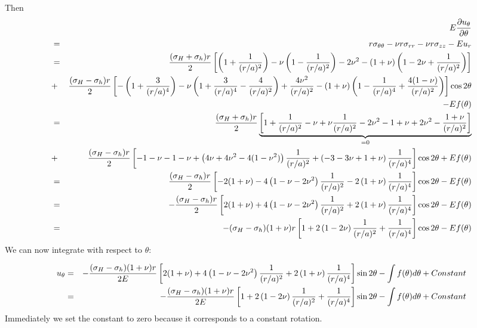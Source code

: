 Then
\begin{eqnarray}
&&E\frac{\partial u_\theta}{\partial \theta} \nonumber\\
&=& r\sigma_{\theta\theta} -\nu r\sigma_{rr} -\nu r\sigma_{zz} - E u_r  \nonumber\\
&=& \frac{(\sigma_H+\sigma_h)r}{2} 
\left[ 
\left(1+\frac{1}{(r/a)^2} \right)
-\nu\left(1-\frac{1}{(r/a)^2} \right)
-2 \nu^2
-(1+\nu) \left( 1 -2\nu +\frac{1}{(r/a)^2} \right) 
\right] \nonumber\\
&+&
\frac{(\sigma_H-\sigma_h) r}{2}
\left[
-\left( 1 + \frac{3}{(r/a)^4}   \right)
-\nu\left( 1 + \frac{3}{(r/a)^4} - \frac{4}{(r/a)^2}   \right)
+ \frac{4 \nu^2  }{(r/a)^2}
-(1+\nu)\left(  1 - \frac{1}{(r/a)^4} + \frac{4(1-\nu)}{(r/a)^2}  \right)
\right] \cos 2\theta \nonumber\\
&&  -E f(\theta)\nonumber\\
&=& 
\frac{(\sigma_H+\sigma_h)r}{2} 
\underbrace{\left[ 
1+\frac{1}{(r/a)^2} 
-\nu +\nu \frac{1}{(r/a)^2} 
-2\nu^2 - 1 +\nu  +2 \nu^2 -\frac{1+\nu}{(r/a)^2} 
\right]}_{=0} \nonumber\\
&+&
\frac{(\sigma_H-\sigma_h) r}{2}
\left[
-1 -\nu  -1 -\nu
+\left(  4\nu +4\nu^2 -4(1-\nu^2)  \right)\frac{1}{(r/a)^2}
+\left( -3 -3\nu +1+\nu  \right)\frac{1}{(r/a)^4}
\right] \cos 2\theta  + E f(\theta)\nonumber\\
&=& 
\frac{(\sigma_H-\sigma_h) r}{2}
\left[
-2(1+\nu)
-4\left( 1 - \nu -2\nu^2 \right)\frac{1}{(r/a)^2}
-2 \left( 1+\nu   \right)\frac{1}{(r/a)^4}
\right] \cos 2\theta    -E f(\theta) \nonumber\\
&=& 
-\frac{(\sigma_H-\sigma_h) r}{2}
\left[ 2(1+\nu) +4\left( 1 - \nu -2\nu^2 \right)\frac{1}{(r/a)^2}
+2 \left( 1+\nu   \right)\frac{1}{(r/a)^4}
\right] \cos 2\theta -E f(\theta) \nonumber\\
&=& 
-(\sigma_H-\sigma_h)(1+\nu) r
\left[ 
1 +2\left( 1 - 2\nu \right)\frac{1}{(r/a)^2}
+ \frac{1}{(r/a)^4}
\right] \cos 2\theta -E f(\theta) \nonumber
\end{eqnarray}
We can now integrate with respect to $\theta$:


\begin{eqnarray}
u_\theta
&=& 
-\frac{(\sigma_H-\sigma_h)(1+\nu) r}{2E}
\left[
2(1+\nu)
+4\left( 1 - \nu -2\nu^2 \right)\frac{1}{(r/a)^2}
+2 \left( 1+\nu   \right)\frac{1}{(r/a)^4}
\right]  \sin 2\theta - \int f(\theta) d\theta + Constant\nonumber\\
&=& 
-\frac{(\sigma_H-\sigma_h) (1+\nu)r}{2E}
\left[
1 +2\left( 1 - 2\nu \right)\frac{1}{(r/a)^2}
+ \frac{1}{(r/a)^4}
\right]  \sin 2\theta - \int f(\theta) d\theta + Constant \nonumber
\end{eqnarray}
Immediately we set the constant to zero because it corresponds to a constant rotation.




